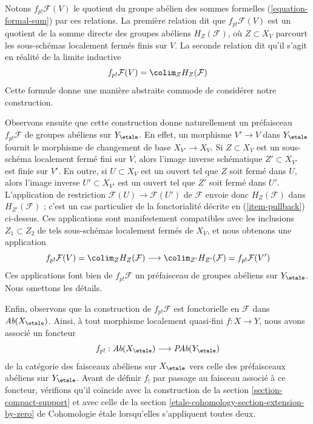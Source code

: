 \medskip\noindent
Notons $f_{p!}\mathcal{F}(V)$ le quotient du groupe abélien
des sommes formelles (\ref{equation-formal-sum}) par ces relations.
La première relation dit que $f_{p!}\mathcal{F}(V)$ est un quotient
de la somme directe des groupes abéliens $H_Z(\mathcal{F})$,
où $Z \subset X_V$ parcourt les sous-schémas localement fermés finis sur $V$.
La seconde relation dit qu'il s'agit en réalité de la limite inductive
\begin{equation}
\label{equation-colimit-definition}
f_{p!}\mathcal{F}(V) = \colim_Z H_Z(\mathcal{F})
\end{equation}
Cette formule donne une manière abstraite commode de considérer
notre construction.

\medskip\noindent
Observons ensuite que cette construction donne naturellement un préfaisceau
$f_{p!}\mathcal{F}$ de groupes abéliens sur $Y_\etale$.
En effet, un morphisme $V' \to V$ dans $Y_\etale$ fournit le morphisme de changement de base
$X_{V'} \to X_V$. Si $Z \subset X_V$ est un sous-schéma localement fermé
fini sur $V$, alors l'image inverse schématique $Z' \subset X_{V'}$
est finie sur $V'$. En outre, si $U \subset X_V$ est un ouvert tel
que $Z$ soit fermé dans $U$, alors l'image inverse $U' \subset X_{V'}$
est un ouvert tel que $Z'$ soit fermé dans $U'$. L'application de restriction
$\mathcal{F}(U) \to \mathcal{F}(U')$ de $\mathcal{F}$
envoie donc $H_Z(\mathcal{F})$ dans $H_{Z'}(\mathcal{F})$ ; c'est un cas
particulier de la fonctorialité décrite en (\ref{item-pullback}) ci-dessus.
Ces applications sont manifestement compatibles avec les inclusions
$Z_1 \subset Z_2$ de tels sous-schémas localement fermés de $X_V$, et
nous obtenons une application
$$
f_{p!}\mathcal{F}(V) = \colim_Z H_Z(\mathcal{F})
\longrightarrow
\colim_{Z'} H_{Z'}(\mathcal{F}) =
f_{p!}\mathcal{F}(V')
$$
Ces applications font bien de $f_{p!}\mathcal{F}$ un préfaisceau de groupes
abéliens sur $Y_\etale$. Nous omettons les détails.

\medskip\noindent
Enfin, observons que la construction de $f_{p!}\mathcal{F}$
est fonctorielle en $\mathcal{F}$ dans $\textit{Ab}(X_\etale)$.
Ainsi, à tout morphisme localement quasi-fini $f : X \to Y$,
nous avons associé un foncteur
$$
f_{p!} :
\textit{Ab}(X_\etale)
\longrightarrow
\textit{PAb}(Y_\etale)
$$
de la catégorie des faisceaux abéliens sur $X_\etale$ vers celle
des préfaisceaux abéliens sur $Y_\etale$. Avant de définir $f_!$ par
passage au faisceau associé à ce foncteur, vérifions qu'il coïncide avec
la construction de la section \ref{section-compact-support}
et avec celle de la
section \ref{etale-cohomology-section-extension-by-zero} de Cohomologie étale
lorsqu'elles s'appliquent toutes deux.

